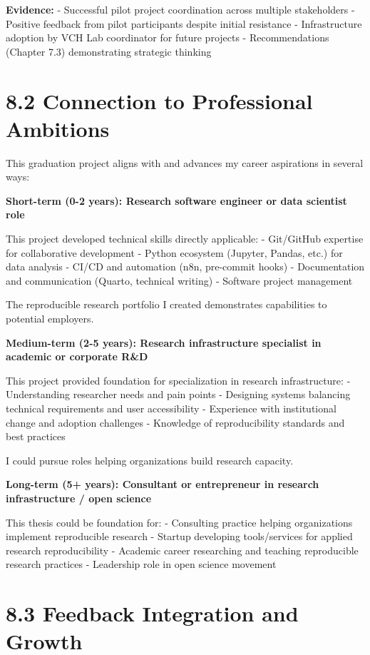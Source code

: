 \documentclass[
  oneside,
  open=any]{scrbook}
\begin{document}
\textbf{Evidence:} - Successful pilot project coordination across
multiple stakeholders - Positive feedback from pilot participants
despite initial resistance - Infrastructure adoption by VCH Lab
coordinator for future projects - Recommendations (Chapter 7.3)
demonstrating strategic thinking

\section{8.2 Connection to Professional
Ambitions}\label{connection-to-professional-ambitions}

This graduation project aligns with and advances my career aspirations
in several ways:

\textbf{Short-term (0-2 years): Research software engineer or data
scientist role}

This project developed technical skills directly applicable: -
Git/GitHub expertise for collaborative development - Python ecosystem
(Jupyter, Pandas, etc.) for data analysis - CI/CD and automation (n8n,
pre-commit hooks) - Documentation and communication (Quarto, technical
writing) - Software project management

The reproducible research portfolio I created demonstrates capabilities
to potential employers.

\textbf{Medium-term (2-5 years): Research infrastructure specialist in
academic or corporate R\&D}

This project provided foundation for specialization in research
infrastructure: - Understanding researcher needs and pain points -
Designing systems balancing technical requirements and user
accessibility - Experience with institutional change and adoption
challenges - Knowledge of reproducibility standards and best practices

I could pursue roles helping organizations build research capacity.

\textbf{Long-term (5+ years): Consultant or entrepreneur in research
infrastructure / open science}

This thesis could be foundation for: - Consulting practice helping
organizations implement reproducible research - Startup developing
tools/services for applied research reproducibility - Academic career
researching and teaching reproducible research practices - Leadership
role in open science movement

\section{8.3 Feedback Integration and
Growth}\label{feedback-integration-and-growth}
\end{document}

